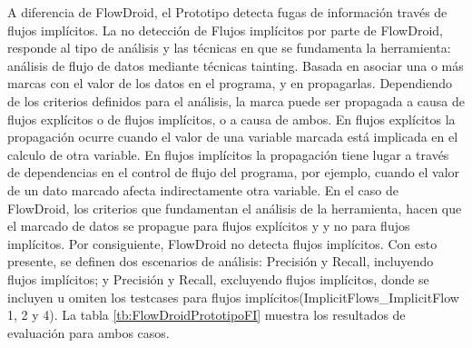 A diferencia de FlowDroid, el Prototipo detecta fugas de información través de
flujos implícitos. La no detección de Flujos implícitos por parte de FlowDroid,
responde al tipo de análisis y las técnicas en que se fundamenta la herramienta:
análisis de flujo de datos mediante técnicas tainting. Basada en 
% 
% 
asociar una o más marcas
con el valor de los datos en el programa, y en propagarlas. Dependiendo de los
criterios definidos para el análisis, la marca puede ser propagada a causa de
flujos explícitos o de flujos implícitos, o a causa de ambos. En flujos
explícitos la propagación ocurre cuando el valor de una variable marcada está
implicada en el calculo de otra variable. En flujos implícitos la propagación
tiene lugar a través de dependencias en el control de flujo del programa, por
ejemplo, cuando el valor de un dato marcado afecta indirectamente otra variable.\newline 
En el caso de FlowDroid, los criterios que fundamentan el análisis de la
herramienta, hacen que el marcado de datos se propague para flujos explícitos y
y no para flujos implícitos. Por consiguiente, FlowDroid no detecta flujos
implícitos.\newline
Con esto presente, se definen dos escenarios de análisis: Precisión y Recall,
incluyendo flujos implícitos; y  Precisión y Recall, excluyendo flujos
implícitos, donde se incluyen u omiten los testcases para flujos
implícitos(ImplicitFlows\_ImplicitFlow 1, 2 y 4).
La tabla \ref{tb:FlowDroidPrototipoFI} muestra los resultados de evaluación para
ambos casos.\newline

